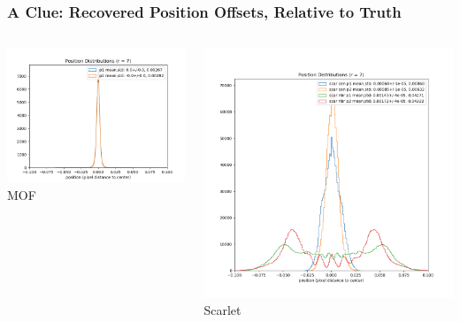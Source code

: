 \documentclass{beamer}
\begin{document}
\frame
{

    \frametitle{A Clue: Recovered Position Offsets, Relative to Truth}

    \begin{columns}
        \begin{column}{0.5\textwidth}
            \centering
            \includegraphics[width=\textwidth]{mof-posit-r7-lownoise.png}
            \newline
            MOF
        \end{column}
        \begin{column}{0.5\textwidth}
            \centering
            \includegraphics[width=\textwidth]{scar-posit-r7-lownoise.png}
            \newline
            Scarlet
        \end{column}
    \end{columns}

}
\end{document}
